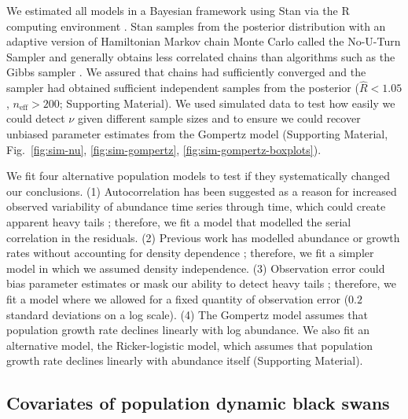 We estimated all models in a Bayesian framework using Stan
\citep[][version 2.4.0]{stan-manual2014} via the R computing environment \citep{r2014}. Stan
samples from the posterior distribution with an adaptive version of
Hamiltonian Markov chain Monte Carlo called the No-U-Turn Sampler and
generally obtains less correlated chains than algorithms such as the Gibbs
sampler \citep{hoffman2014}. We assured that chains had sufficiently converged
and the sampler had obtained sufficient independent samples from the posterior
($\widehat{R} < 1.05$, $n_\mathrm{eff} > 200$; Supporting Material). We used
simulated data to test how easily we could detect $\nu$ given different sample
sizes and to ensure we could recover unbiased parameter estimates from the
Gompertz model (Supporting Material, Fig.~\ref{fig:sim-nu},
\ref{fig:sim-gompertz}, \ref{fig:sim-gompertz-boxplots}).

We fit four alternative population models to test if they systematically
changed our conclusions. (1) Autocorrelation has been suggested as a reason for
increased observed variability of abundance time series through time, which
could create apparent heavy tails \citep{inchausti2002}; therefore, we fit
a model that modelled the serial correlation in the residuals. (2) Previous
work has modelled abundance or growth rates without accounting for density
dependence \citep{halley2002,segura2013}; therefore, we fit a simpler model in
which we assumed density independence. (3) Observation error could bias
parameter estimates \citep{knape2012} or mask our ability to detect heavy tails
\citep{ward2007}; therefore, we fit a model where we allowed for a fixed
quantity of observation error ($0.2$ standard deviations on a log scale). (4)
The Gompertz model assumes that population growth rate declines linearly with
log abundance. We also fit an alternative model, the Ricker-logistic model,
which assumes that population growth rate declines linearly with abundance
itself (Supporting Material).



\subsection{Covariates of population dynamic black swans}

